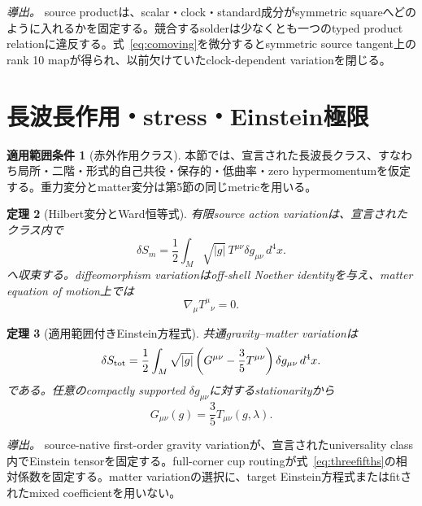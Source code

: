 \documentclass[11pt]{article}
\newtheorem{theorem}{定理}[section]
\theoremstyle{definition}
\newtheorem{scope}[theorem]{適用範囲条件}
\theoremstyle{remark}
\begin{document}
\textit{導出。} source productは、scalar・clock・standard成分がsymmetric squareへどのように入れるかを固定する。競合するsolderは少なくとも一つのtyped product relationに違反する。式~\eqref{eq:comoving}を微分するとsymmetric source tangent上のrank 10 mapが得られ、以前欠けていたclock-dependent variationを閉じる。

\section{長波長作用・stress・Einstein極限}

\begin{scope}[赤外作用クラス]
本節では、宣言された長波長クラス、すなわち局所・二階・形式的自己共役・保存的・低曲率・zero hypermomentumを仮定する。重力変分とmatter変分は第5節の同じmetricを用いる。
\end{scope}

\begin{theorem}[Hilbert変分とWard恒等式]
有限source action variationは、宣言されたクラス内で
\begin{equation}
\delta S_m
=\frac12\int_M\sqrt{|g|}\,T^{\mu\nu}\delta g_{\mu\nu}\,d^4x.
\label{eq:hilbert}
\end{equation}
へ収束する。diffeomorphism variationはoff-shell Noether identityを与え、matter equation of motion上では
\begin{equation}
\nabla_\mu T^{\mu}{}_{\nu}=0.
\label{eq:ward}
\end{equation}
\end{theorem}

\begin{theorem}[適用範囲付きEinstein方程式]
共通gravity--matter variationは
\begin{equation}
\delta S_{\rm tot}
=\frac12\int_M\sqrt{|g|}
\left(G^{\mu\nu}-\frac35T^{\mu\nu}\right)
\delta g_{\mu\nu}\,d^4x.
\label{eq:totalvariation}
\end{equation}
である。任意のcompactly supported $\delta g_{\mu\nu}$に対するstationarityから
\begin{equation}
G_{\mu\nu}(g)=\frac35T_{\mu\nu}(g,\lambda).
\label{eq:einstein}
\end{equation}
\end{theorem}

\textit{導出。} source-native first-order gravity variationが、宣言されたuniversality class内でEinstein tensorを固定する。full-corner cup routingが式~\eqref{eq:threefifths}の相対係数を固定する。matter variationの選択に、target Einstein方程式またはfitされたmixed coefficientを用いない。
\end{document}
